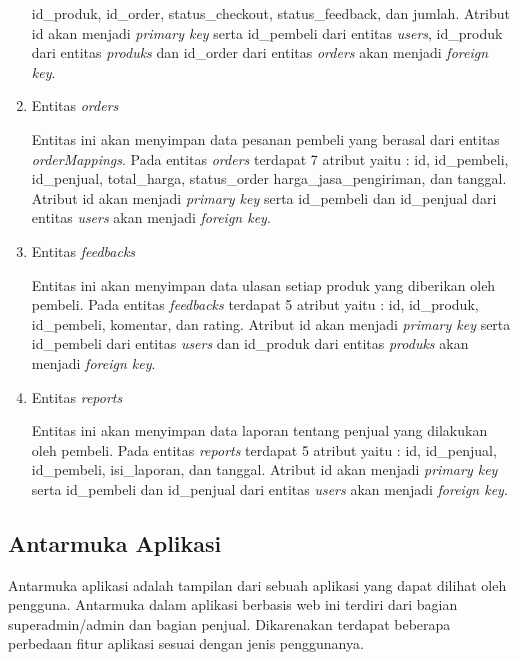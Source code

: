 \begin{enumerate}
	id\_produk, id\_order, status\_checkout, status\_feedback, dan jumlah. Atribut id
	akan menjadi \textit{primary key} serta id\_pembeli dari entitas \textit{users}, id\_produk dari entitas \textit{produks} dan id\_order dari entitas \textit{orders} akan menjadi \textit{foreign key}.
	\item Entitas \textit{orders}
	\par Entitas ini akan menyimpan data pesanan pembeli yang berasal dari entitas \textit{orderMappings}. Pada entitas \textit{orders} terdapat 7 atribut yaitu : id, id\_pembeli, id\_penjual, total\_harga, status\_order harga\_jasa\_pengiriman, dan tanggal. Atribut id akan menjadi \textit{primary key} serta id\_pembeli dan id\_penjual dari entitas \textit{users} akan menjadi \textit{foreign key}.
	\item Entitas \textit{feedbacks}
	\par Entitas ini akan menyimpan data ulasan setiap produk yang diberikan oleh pembeli. Pada entitas \textit{feedbacks} terdapat 5 atribut yaitu : id, id\_produk,
	id\_pembeli, komentar, dan rating. Atribut id akan menjadi \textit{primary key} serta id\_pembeli dari entitas \textit{users} dan id\_produk dari entitas \textit{produks} akan menjadi \textit{foreign key}.
	\item Entitas \textit{reports}
	\par Entitas ini akan menyimpan data laporan tentang penjual yang dilakukan oleh pembeli. Pada entitas \textit{reports} terdapat 5 atribut yaitu : id, id\_penjual, id\_pembeli, isi\_laporan, dan tanggal. Atribut id akan menjadi \textit{primary key} serta id\_pembeli dan id\_penjual dari entitas \textit{users} akan menjadi \textit{foreign key}.
\end{enumerate}
	
\subsection{Antarmuka Aplikasi}
Antarmuka aplikasi adalah tampilan dari sebuah aplikasi yang dapat dilihat oleh pengguna. Antarmuka dalam aplikasi berbasis web ini terdiri dari bagian superadmin/admin dan bagian penjual. Dikarenakan terdapat beberapa perbedaan fitur aplikasi sesuai dengan jenis penggunanya.

